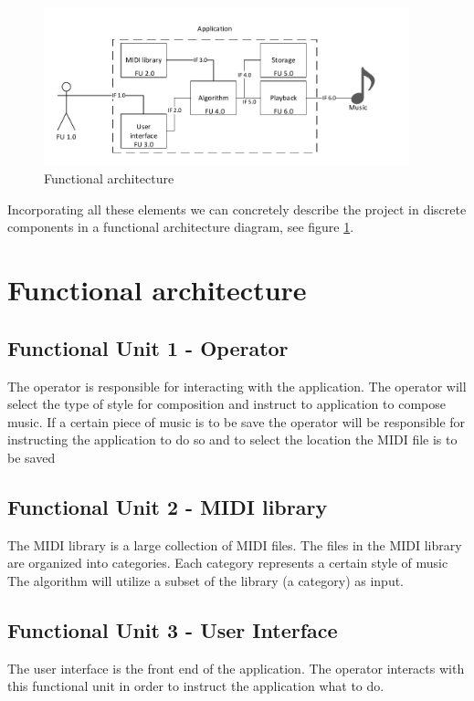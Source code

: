 \begin{figure}
\centerline{\includegraphics[width=400px]{../images/architecture.pdf}}
\caption{Functional architecture}
\label{ims:funcarch}
\end{figure}

Incorporating all these elements we can concretely describe the project in discrete components in a functional architecture diagram, see figure \ref{ims:funcarch}.

\section{Functional architecture}
\subsection{Functional Unit 1 - Operator}
The operator is responsible for interacting with the application. The operator will select the type of style for composition and instruct to application to compose music.
If a certain piece of music is to be save the operator will be responsible for instructing the application to do so and to select the location the \ac{MIDI} file is to be saved

\subsection{Functional Unit 2 - MIDI library }
The MIDI library is a large collection of \ac{MIDI} files. The files in the \ac{MIDI} library are organized into categories. Each category represents a certain style of music
The algorithm will utilize a subset of the library (a category) as input.

\subsection{Functional Unit 3 - User Interface}
The user interface is the front end of the application. The operator interacts with this functional unit in order to instruct the application what to do.

